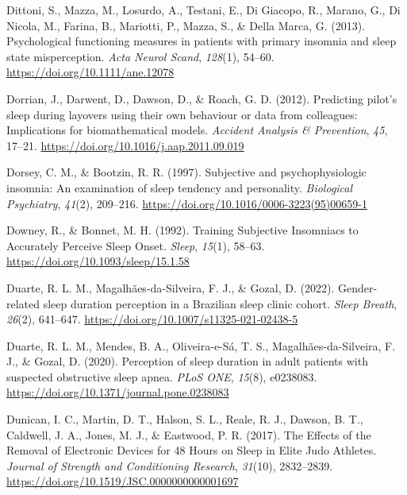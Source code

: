 \documentclass[
]{article}
\newlength{\cslhangindent}
\newenvironment{CSLReferences}[2] %
 {\begin{list}{}{%
  \setlength{\itemindent}{0pt}
  \setlength{\leftmargin}{0pt}
  \setlength{\parsep}{0pt}
  \ifodd #1
   \setlength{\leftmargin}{\cslhangindent}
   \setlength{\itemindent}{-1\cslhangindent}
  \fi
  \setlength{\itemsep}{#2\baselineskip}}}
 {\end{list}}
\begin{document}
\begin{CSLReferences}{1}{0}
Dittoni, S., Mazza, M., Losurdo, A., Testani, E., Di Giacopo, R., Marano, G., Di Nicola, M., Farina, B., Mariotti, P., Mazza, S., \& Della Marca, G. (2013). Psychological functioning measures in patients with primary insomnia and sleep state misperception. \emph{Acta Neurol Scand}, \emph{128}(1), 54--60. \url{https://doi.org/10.1111/ane.12078}

Dorrian, J., Darwent, D., Dawson, D., \& Roach, G. D. (2012). Predicting pilot's sleep during layovers using their own behaviour or data from colleagues: {Implications} for biomathematical models. \emph{Accident Analysis \& Prevention}, \emph{45}, 17--21. \url{https://doi.org/10.1016/j.aap.2011.09.019}

Dorsey, C. M., \& Bootzin, R. R. (1997). Subjective and psychophysiologic insomnia: {An} examination of sleep tendency and personality. \emph{Biological Psychiatry}, \emph{41}(2), 209--216. \url{https://doi.org/10.1016/0006-3223(95)00659-1}

Downey, R., \& Bonnet, M. H. (1992). Training {Subjective} {Insomniacs} to {Accurately} {Perceive} {Sleep} {Onset}. \emph{Sleep}, \emph{15}(1), 58--63. \url{https://doi.org/10.1093/sleep/15.1.58}

Duarte, R. L. M., Magalhães-da-Silveira, F. J., \& Gozal, D. (2022). Gender-related sleep duration perception in a {Brazilian} sleep clinic cohort. \emph{Sleep Breath}, \emph{26}(2), 641--647. \url{https://doi.org/10.1007/s11325-021-02438-5}

Duarte, R. L. M., Mendes, B. A., Oliveira-e-Sá, T. S., Magalhães-da-Silveira, F. J., \& Gozal, D. (2020). Perception of sleep duration in adult patients with suspected obstructive sleep apnea. \emph{PLoS ONE}, \emph{15}(8), e0238083. \url{https://doi.org/10.1371/journal.pone.0238083}

Dunican, I. C., Martin, D. T., Halson, S. L., Reale, R. J., Dawson, B. T., Caldwell, J. A., Jones, M. J., \& Eastwood, P. R. (2017). The {Effects} of the {Removal} of {Electronic} {Devices} for 48 {Hours} on {Sleep} in {Elite} {Judo} {Athletes}. \emph{Journal of Strength and Conditioning Research}, \emph{31}(10), 2832--2839. \url{https://doi.org/10.1519/JSC.0000000000001697}


\end{CSLReferences}
\end{document}

